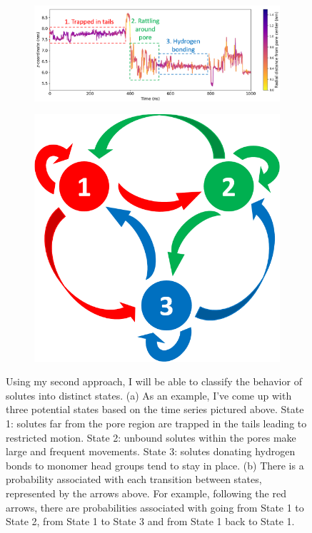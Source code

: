 \documentclass{article}
\begin{document}
  \begin{figure}
  \centering
  \vspace{-0.5cm}
  \begin{subfigure}{0.725\linewidth}
  \includegraphics[width=\linewidth]{markov_states_timeseries.png}
  \caption{}\label{fig:markov_states_timeseries}
  \end{subfigure}
  \begin{subfigure}{0.25\linewidth}
  \includegraphics[width=\linewidth]{markov.png}
  \caption{}\label{fig:markov}
  \end{subfigure}
  \caption{Using my second approach, I will be able to classify the behavior
  of solutes into distinct states. (a) As an example, I've come up with three
  potential states based on the time series pictured above. State 1: solutes
  far from the pore region are trapped in the tails leading to restricted 
  motion. State 2: unbound solutes within the pores make large and frequent
  movements. State 3: solutes donating hydrogen bonds to monomer head groups
  tend to stay in place. (b) There is a probability associated with each
  transition between states, represented by the arrows above. For example, following
  the red arrows, there are probabilities associated with going from State 1 to
  State 2, from State 1 to State 3 and from State 1 back to State 1.
  }\label{fig:markov_states}
  \vspace{-.5cm}
  \end{figure}
  
\end{document}
